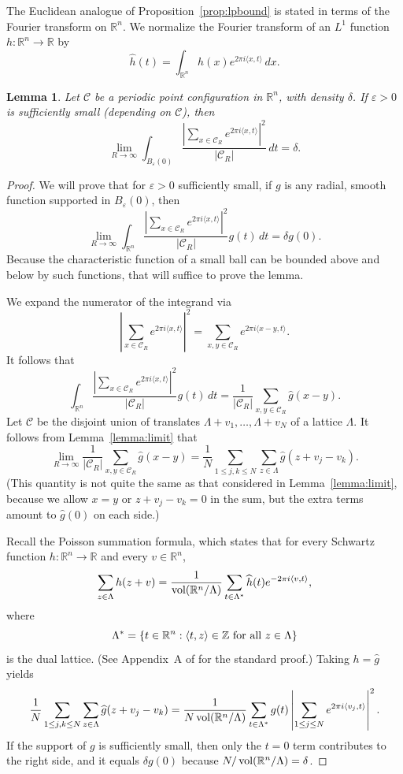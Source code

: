 \documentclass{jams-l}
\theoremstyle{plain}
\newtheorem{lemma}[theorem]{Lemma}
\numberwithin{theorem}{section}
\theoremstyle{definition}
\numberwithin{equation}{section}
\newcommand{\R}{{\mathbb R}}
\newcommand{\Z}{{\mathbb Z}}
\newcommand{\vol}{\mathop{\textup{vol}}}
\newcommand{\co}{\colon}
\begin{document}
The Euclidean analogue of Proposition~\ref{prop:lpbound} is stated
in terms of the Fourier transform on $\R^n$. We normalize the
Fourier transform of an $L^1$ function $h \co \R^n \to \R$ by
$$
\widehat{h}(t) = \int_{\R^n} h(x) e^{2\pi i \langle x,t \rangle}
\, dx.
$$

\begin{lemma} \label{lemma:integral}
Let $\mathcal{C}$ be a periodic point configuration in $\R^n$,
with density $\delta$. If $\varepsilon>0$ is sufficiently small
(depending on $\mathcal{C}$), then
$$
\lim_{R \to \infty} \int_{B_\varepsilon(0)} \frac{\left|\sum_{x
\in \mathcal{C}_R} e^{2\pi i \langle x,t \rangle}
\right|^2}{|\mathcal{C}_R|} \, dt = \delta.
$$
\end{lemma}

\begin{proof}
We will prove that for $\varepsilon>0$ sufficiently small, if $g$
is any radial, smooth function supported in $B_\varepsilon(0)$,
then
$$
\lim_{R \to \infty} \int_{\R^n} \frac{\left|\sum_{x \in
\mathcal{C}_R} e^{2\pi i \langle x,t \rangle}
\right|^2}{|\mathcal{C}_R|} g(t) \, dt = \delta g(0).
$$
Because the characteristic function of a small ball can be bounded
above and below by such functions, that will suffice to prove the
lemma.

We expand the numerator of the integrand via
$$
\left|\sum_{x \in \mathcal{C}_R} e^{2\pi i \langle x,t \rangle}
\right|^2 = \sum_{x,y \in \mathcal{C}_R} e^{2\pi i \langle x-y,t
\rangle}.
$$
It follows that
$$
\int_{\R^n} \frac{\left|\sum_{x \in \mathcal{C}_R} e^{2\pi i
\langle x,t \rangle} \right|^2}{|\mathcal{C}_R|} g(t) \, dt =
\frac{1}{|\mathcal{C}_R|}\sum_{x,y \in \mathcal{C}_R}
\widehat{g}(x-y).
$$
Let $\mathcal{C}$ be the disjoint union of translates
$\Lambda+v_1,\dots,\Lambda+v_N$ of a lattice $\Lambda$.  It
follows from Lemma~\ref{lemma:limit} that
$$
\lim_{R \to \infty} \frac{1}{|\mathcal{C}_R|}\sum_{x,y \in
\mathcal{C}_R} \widehat{g}(x-y) = \frac{1}{N} \sum_{1 \le j,k \le
N} \sum_{z \in \Lambda} \widehat{g}(z+v_j-v_k).
$$
(This quantity is not quite the same as that considered in
Lemma~\ref{lemma:limit}, because we allow $x=y$ or $z+v_j-v_k=0$
in the sum, but the extra terms amount to $\widehat{g}(0)$ on each
side.)

Recall the Poisson summation formula, which states that for every
Schwartz function $h \co \R^n \to \R$ and every $v \in \R^n$,
$$
\sum_{z \in \Lambda} h(z+v) = \frac{1}{\vol(\R^n/\Lambda)} \sum_{t
\in \Lambda^*} \widehat{h}(t) e^{-2\pi i \langle v,t \rangle},
$$
where
$$
\Lambda^* = \{ t \in \R^n : \langle t,z \rangle \in \Z \textup{
for all $z \in \Lambda$} \}
$$
is the dual lattice.  (See Appendix~A of \cite{CK2} for the
standard proof.) Taking $h = \widehat{g}$ yields
$$
\frac{1}{N} \sum_{1 \le j,k \le N} \sum_{z \in \Lambda}
\widehat{g}(z+v_j-v_k) = \frac{1}{N\vol(\R^n/\Lambda)} \sum_{t \in
\Lambda^*} g(t) \left|\sum_{1 \le j \le N} e^{2\pi i \langle v_j,
t\rangle }\right|^2.
$$
If the support of $g$ is sufficiently small, then only the $t=0$
term contributes to the right side, and it equals $\delta g(0)$
because $N/\vol(\R^n/\Lambda) = \delta$.
\end{proof}
\end{document}
